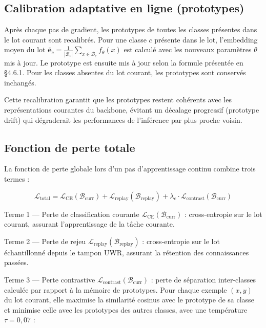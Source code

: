 \subsection{Calibration adaptative en ligne (prototypes)}

Après chaque pas de gradient, les prototypes de toutes les classes présentes dans le lot courant sont recalibrés. Pour une classe $c$ présente dans le lot, l'embedding moyen du lot $\bar{\boldsymbol{e}}_c = \frac{1}{|\mathcal{B}_c|}\sum_{x \in \mathcal{B}_c} f_\theta(x)$ est calculé avec les nouveaux paramètres $\theta$ mis à jour. Le prototype est ensuite mis à jour selon la formule présentée en §4.6.1. Pour les classes absentes du lot courant, les prototypes sont conservés inchangés.

Cette recalibration garantit que les prototypes restent cohérents avec les représentations courantes du backbone, évitant un décalage progressif (prototype drift) qui dégraderait les performances de l'inférence par plus proche voisin.

\subsection{Fonction de perte totale}

La fonction de perte globale lors d'un pas d'apprentissage continu combine trois termes :

$$\mathcal{L}_{\mathrm{total}} = \mathcal{L}_{\mathrm{CE}}(\mathcal{B}_{\mathrm{curr}}) + \mathcal{L}_{\mathrm{replay}}(\mathcal{B}_{\mathrm{replay}}) + \lambda_c \cdot \mathcal{L}_{\mathrm{contrast}}(\mathcal{B}_{\mathrm{curr}})$$

Terme 1 — Perte de classification courante $\mathcal{L}_{\mathrm{CE}}(\mathcal{B}_{\mathrm{curr}})$ : cross-entropie sur le lot courant, assurant l'apprentissage de la tâche courante.

Terme 2 — Perte de rejeu $\mathcal{L}_{\mathrm{replay}}(\mathcal{B}_{\mathrm{replay}})$ : cross-entropie sur le lot échantillonné depuis le tampon UWR, assurant la rétention des connaissances passées.

Terme 3 — Perte contrastive $\mathcal{L}_{\mathrm{contrast}}(\mathcal{B}_{\mathrm{curr}})$ : perte de séparation inter-classes calculée par rapport à la mémoire de prototypes. Pour chaque exemple $(x, y)$ du lot courant, elle maximise la similarité cosinus avec le prototype de sa classe et minimise celle avec les prototypes des autres classes, avec une température $\tau = 0{,}07$ :

